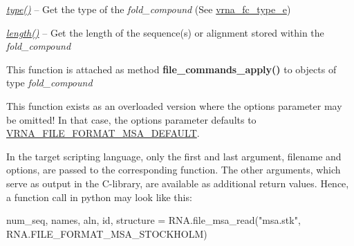 \begin{DoxyRefList}
\begin{DoxyItemize}
\item {\itshape \mbox{\hyperlink{group__fold__compound_ac5eab693deac9a1a40c2a95ac294707c}{type()}}} -- Get the type of the {\itshape fold\+\_\+compound} (See \mbox{\hyperlink{group__fold__compound_ga01a4ff86fa71deaaa5d1abbd95a1447d}{vrna\+\_\+fc\+\_\+type\+\_\+e}})
\item {\itshape \mbox{\hyperlink{group__fold__compound_a95fbfed770b858e50c766505dc4bf998}{length()}}} -- Get the length of the sequence(s) or alignment stored within the {\itshape fold\+\_\+compound} 
\end{DoxyItemize}
\item[\label{wrappers__wrappers000004}%
\Hypertarget{wrappers__wrappers000004}%
Global \mbox{\hyperlink{group__file__utils_gadbe8c9622f7bcc6dcbe3448b98df8656}{vrna\+\_\+file\+\_\+commands\+\_\+apply}} (vrna\+\_\+fold\+\_\+compound\+\_\+t $\ast$vc, const char $\ast$filename, unsigned int options)]This function is attached as method {\bfseries file\+\_\+commands\+\_\+apply()} to objects of type {\itshape fold\+\_\+compound}  
\item[\label{wrappers__wrappers000059}%
\Hypertarget{wrappers__wrappers000059}%
Global \mbox{\hyperlink{group__file__utils_ga627ac281b5f11c63861726e6472626c9}{vrna\+\_\+file\+\_\+msa\+\_\+detect\+\_\+format}} (const char $\ast$filename, unsigned int options)]This function exists as an overloaded version where the {\ttfamily options} parameter may be omitted! In that case, the {\ttfamily options} parameter defaults to \mbox{\hyperlink{group__file__utils_ga4acc255373831856a8417b68de8a94c0}{V\+R\+N\+A\+\_\+\+F\+I\+L\+E\+\_\+\+F\+O\+R\+M\+A\+T\+\_\+\+M\+S\+A\+\_\+\+D\+E\+F\+A\+U\+LT}}.  
\item[\label{wrappers__wrappers000060}%
\Hypertarget{wrappers__wrappers000060}%
Global \mbox{\hyperlink{group__file__utils_ga08a01c40ac5f5e0e04e9ae2258c99aa6}{vrna\+\_\+file\+\_\+msa\+\_\+read}} (const char $\ast$filename, char $\ast$$\ast$$\ast$names, char $\ast$$\ast$$\ast$aln, char $\ast$$\ast$id, char $\ast$$\ast$structure, unsigned int options)]In the target scripting language, only the first and last argument, {\ttfamily filename} and {\ttfamily options}, are passed to the corresponding function. The other arguments, which serve as output in the C-\/library, are available as additional return values. Hence, a function call in python may look like this\+:


\begin{DoxyCode}
num\_seq, names, aln, id, structure = RNA.file\_msa\_read(\textcolor{stringliteral}{"msa.stk"}, RNA.FILE\_FORMAT\_MSA\_STOCKHOLM)
\end{DoxyCode}



\end{DoxyRefList}
